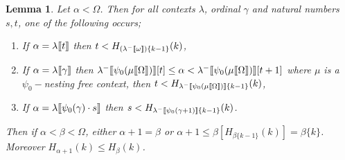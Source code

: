 \documentclass{amsart}
\theoremstyle{plain}
\theoremstyle{plain}
\newtheorem{lemma}[theorem]{Lemma}
\def\scbrl{[\hspace{-.14em}[}
\def\scbrr{]\hspace{-.14em}]}
\def\scbr#1{\scbrl#1\scbrr}
\newcommand{\Om}{{\Omega}}
\newcommand{\al}{{\alpha}}
\newcommand{\be}{{\beta}}
\newcommand{\ga}{\gamma}
\newcommand{\la}{\lambda}
\newcommand{\om}{\omega}
\def\scbrl{[\hspace{-.14em}[}
\def\scbrr{]\hspace{-.14em}]}
\def\scbr#1{\scbrl#1\scbrr}
\begin{document}
\begin{lemma}\label{lm:OrdMeasure2}
Let $\al<\Om$. Then for all contexts $\la$, ordinal $\ga$ and natural numbers $s,t$, one of the following occurs;
\begin{enumerate}
    \item \label{case1:lm:OrdMeasure2}If $\al=\la\scbr{t}$ then $t<H_{(\la^-\scbr{\om})\{k-1\}}(k)$,
    \item  \label{case2:lm:OrdMeasure2}If $\al=\la\scbr{\ga}$ then $\la^-\scbr{\psi_0(\mu\scbr{\Om})}[t]\leq\al<\la^-\scbr{\psi_0(\mu\scbr{\Om})}[t+1]$ where $\mu$ is a $\psi_0-$nesting free context, then $t<H_{\la^-\scbr{\psi_0(\mu\scbr{\Om})}\{k-1\}}(k)$,
    \item  \label{case3:lm:OrdMeasure2}If $\al=\la\scbr{\psi_0(\ga)\cdot s}$ then $s<H_{\la^-\scbr{\psi_0(\ga+1)}\{k-1\}}(k)$.
\end{enumerate}
Then if $\al<\be<\Om$, either  $\al+1=\be$ or $\al+1\leq \be[H_{\be\{k-1\}}(k)]=\be\{k\}$. \\
Moreover $H_{\al+1}(k)\leq H_\be(k)$.\medskip
\end{lemma}
\end{document}
